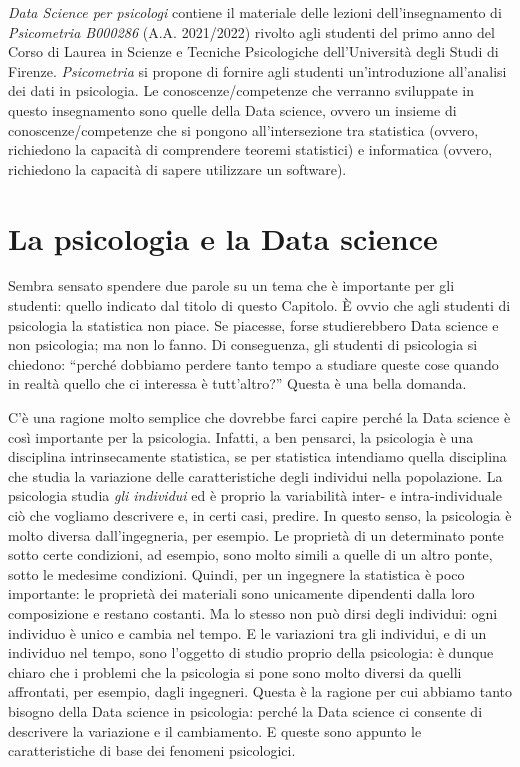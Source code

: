 \documentclass[
  11pt,
]{krantz}
\begin{document}
\emph{Data Science per psicologi} contiene il materiale delle lezioni dell'insegnamento di \emph{Psicometria B000286} (A.A. 2021/2022) rivolto agli studenti del primo anno del Corso di Laurea in Scienze e Tecniche Psicologiche dell'Università degli Studi di Firenze. \emph{Psicometria} si propone di fornire agli studenti un'introduzione all'analisi dei dati in psicologia. Le conoscenze/competenze che verranno sviluppate in questo insegnamento sono quelle della Data science, ovvero un insieme di conoscenze/competenze che si pongono all'intersezione tra statistica (ovvero, richiedono la capacità di comprendere teoremi statistici) e informatica (ovvero, richiedono la capacità di sapere utilizzare un software).

\hypertarget{la-psicologia-e-la-data-science}{%
\section*{La psicologia e la Data science}\label{la-psicologia-e-la-data-science}}


Sembra sensato spendere due parole su un tema che è importante per gli studenti: quello indicato dal titolo di questo Capitolo. È ovvio che agli studenti di psicologia la statistica non piace. Se piacesse, forse studierebbero Data science e non psicologia; ma non lo fanno. Di conseguenza, gli studenti di psicologia si chiedono: ``perché dobbiamo perdere tanto tempo a studiare queste cose quando in realtà quello che ci interessa è tutt'altro?'' Questa è una bella domanda.

C'è una ragione molto semplice che dovrebbe farci capire perché la Data science è così importante per la psicologia. Infatti, a ben pensarci, la psicologia è una disciplina intrinsecamente statistica, se per statistica intendiamo quella disciplina che studia la variazione delle caratteristiche degli individui nella popolazione. La psicologia studia \emph{gli individui} ed è proprio la variabilità inter- e intra-individuale ciò che vogliamo descrivere e, in certi casi, predire. In questo senso, la psicologia è molto diversa dall'ingegneria, per esempio. Le proprietà di un determinato ponte sotto certe condizioni, ad esempio, sono molto simili a quelle di un altro ponte, sotto le medesime condizioni. Quindi, per un ingegnere la statistica è poco importante: le proprietà dei materiali sono unicamente dipendenti dalla loro composizione e restano costanti. Ma lo stesso non può dirsi degli individui: ogni individuo è unico e cambia nel tempo. E le variazioni tra gli individui, e di un individuo nel tempo, sono l'oggetto di studio proprio della psicologia: è dunque chiaro che i problemi che la psicologia si pone sono molto diversi da quelli affrontati, per esempio, dagli ingegneri. Questa è la ragione per cui abbiamo tanto bisogno della Data science in psicologia: perché la Data science ci consente di descrivere la variazione e il cambiamento. E queste sono appunto le caratteristiche di base dei fenomeni psicologici.
\end{document}
